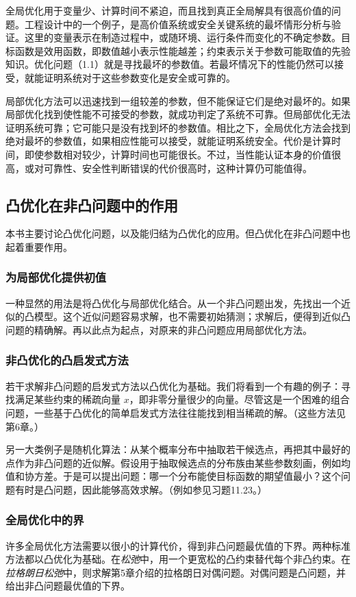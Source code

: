 全局优化用于变量少、计算时间不紧迫，而且找到真正全局解具有很高价值的问题。工程设计中的一个例子，是高价值系统或安全关键系统的最坏情形分析与验证。这里的变量表示在制造过程中，或随环境、运行条件而变化的不确定参数。目标函数是效用函数，即数值越小表示性能越差；约束表示关于参数可能取值的先验知识。优化问题（1.1）就是寻找最坏的参数值。若最坏情况下的性能仍然可以接受，就能证明系统对于这些参数变化是安全或可靠的。

局部优化方法可以迅速找到一组较差的参数，但不能保证它们是绝对最坏的。如果局部优化找到使性能不可接受的参数，就成功判定了系统不可靠。但局部优化无法证明系统可靠；它可能只是没有找到坏的参数值。相比之下，全局优化方法会找到绝对最坏的参数值，如果相应性能可以接受，就能证明系统安全。代价是计算时间，即使参数相对较少，计算时间也可能很长。不过，当性能认证本身的价值很高，或对可靠性、安全性判断错误的代价很高时，这种计算仍可能值得。

\subsection{凸优化在非凸问题中的作用}
本书主要讨论凸优化问题，以及能归结为凸优化的应用。但凸优化在非凸问题中也起着重要作用。

\subsubsection*{为局部优化提供初值}
一种显然的用法是将凸优化与局部优化结合。从一个非凸问题出发，先找出一个近似的凸模型。这个近似问题容易求解，也不需要初始猜测；求解后，便得到近似凸问题的精确解。再以此点为起点，对原来的非凸问题应用局部优化方法。

\subsubsection*{非凸优化的凸启发式方法}
若干求解非凸问题的启发式方法以凸优化为基础。我们将看到一个有趣的例子：寻找满足某些约束的稀疏向量 $x$，即非零分量很少的向量。尽管这是一个困难的组合问题，一些基于凸优化的简单启发式方法往往能找到相当稀疏的解。（这些方法见第6章。）

另一大类例子是随机化算法：从某个概率分布中抽取若干候选点，再把其中最好的点作为非凸问题的近似解。假设用于抽取候选点的分布族由某些参数刻画，例如均值和协方差。于是可以提出问题：哪一个分布能使目标函数的期望值最小？这个问题有时是凸问题，因此能够高效求解。（例如参见习题11.23。）

\subsubsection*{全局优化中的界}
许多全局优化方法需要以很小的计算代价，得到非凸问题最优值的下界。两种标准方法都以凸优化为基础。在\emph{松弛}中，用一个更宽松的凸约束替代每个非凸约束。在\emph{拉格朗日松弛}中，则求解第5章介绍的拉格朗日对偶问题。对偶问题是凸问题，并给出非凸问题最优值的下界。

